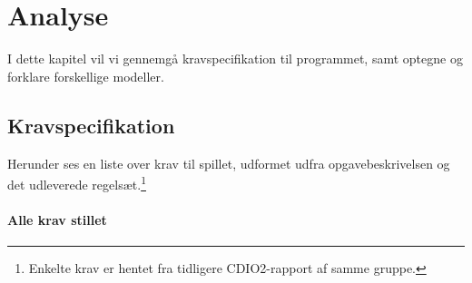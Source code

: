 \chapter{Analyse}

I dette kapitel vil vi gennemgå kravspecifikation til programmet, samt optegne og forklare forskellige modeller.


\section{Kravspecifikation}

Herunder ses en liste over krav til spillet, udformet udfra opgavebeskrivelsen og det udleverede regelsæt.\footnote{Enkelte krav er hentet fra tidligere CDIO2-rapport af samme gruppe.}

\subsubsection{Alle krav stillet}

